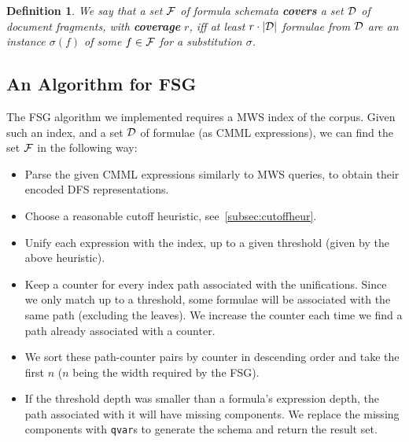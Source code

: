 \documentclass[a4paper,11pt,oneside]{article}
\def\MWS{\textsf{MWS}\xspace}
\newtheorem{definition}{Definition}
\begin{document}
\begin{definition}
  We say that a set $\mathcal{F}$ of formula schemata \textbf{covers} a set $\mathcal{D}$ of
  document fragments, with \textbf{coverage} $r$, iff at least $r \cdot |\mathcal{D}|$
  formulae from $\mathcal{D}$ are an instance $\sigma(f)$ of some $f\in\mathcal{F}$ for a
  substitution $\sigma$.
\end{definition}

\subsection{An Algorithm for FSG}\label{subsec:fsgAlgorithm}
The FSG algorithm we implemented requires a \MWS index of the corpus.
Given such an index, and a set $\mathcal{D}$ of formulae (as CMML expressions),
we can find the set $\mathcal{F}$ in the following way:
\begin{itemize}
    \item Parse the given CMML expressions similarly to \MWS queries,
        to obtain their encoded DFS representations.
    \item Choose a reasonable cutoff heuristic, see~\ref{subsec:cutoffheur}.
    \item Unify each expression with the index, up to a given threshold (given by
        the above heuristic).
    \item Keep a counter for every index path associated with the unifications.
        Since we only match up to a threshold, some formulae will be associated
        with the same path (excluding the leaves).
        We increase the counter each time we find a path already associated
        with a counter.
    \item We sort these path-counter pairs by counter in descending order and
        take the first $n$ ($n$ being the width required by the FSG).
    \item If the threshold depth was smaller than a formula's expression
        depth, the path associated with it will have missing components. We
        replace the missing components with \lstinline|qvar|s to generate the
        schema and return the result set.
\end{itemize}
\end{document}
